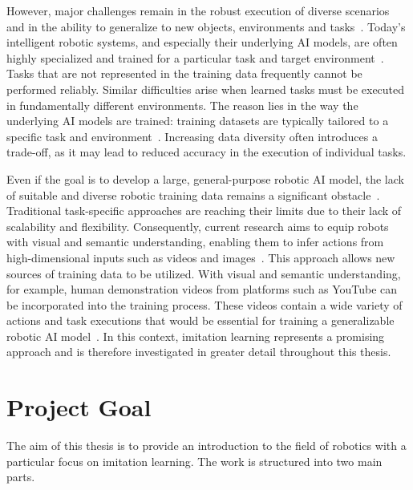 However, major challenges remain in the robust execution of diverse scenarios and in the ability to generalize to new objects, environments and tasks~\cite{LargeVideoPlanner}. Today's intelligent robotic systems, and especially their underlying \ac{AI} models, are often highly specialized and trained for a particular task and target environment~\cite{LargeVideoPlanner}.
Tasks that are not represented in the training data frequently cannot be performed reliably. Similar difficulties arise when learned tasks must be executed in fundamentally different environments. The reason lies in the way the underlying \ac{AI} models are trained: training datasets are typically tailored to a specific task and environment~\cite{McCarthy_2025}. Increasing data diversity often introduces a trade-off, as it may lead to reduced accuracy in the execution of individual tasks.

Even if the goal is to develop a large, general-purpose robotic \ac{AI} model, the lack of suitable and diverse robotic training data remains a significant obstacle~\cite{McCarthy_2025}.
Traditional task-specific approaches are reaching their limits due to their lack of scalability and flexibility. Consequently, current research aims to equip robots with visual and semantic understanding, enabling them to infer actions from high-dimensional inputs such as videos and images~\cite{McCarthy_2025,Eze2024LearningBW}. This approach allows new sources of training data to be utilized. With visual and semantic understanding, for example, human demonstration videos from platforms such as YouTube can be incorporated into the training process. These videos contain a wide variety of actions and task executions that would be essential for training a generalizable robotic \ac{AI} model~\cite{McCarthy_2025}. In this context, imitation learning represents a promising approach and is therefore investigated in greater detail throughout this thesis.



\section{Project Goal}
The aim of this thesis is to provide an introduction to the field of robotics with a particular focus on imitation learning. The work is structured into two main parts.

